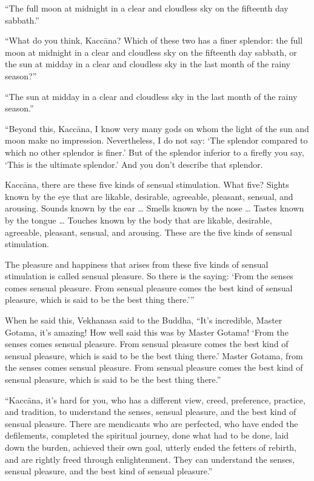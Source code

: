 \documentclass[12pt,openany]{book}%
\begin{document}
“The full moon at midnight in a clear and cloudless sky on the fifteenth day sabbath.” 

“What do you think, \textsanskrit{Kaccāna}? Which of these two has a finer splendor: the full moon at midnight in a clear and cloudless sky on the fifteenth day sabbath, or the sun at midday in a clear and cloudless sky in the last month of the rainy season?” 

“The sun at midday in a clear and cloudless sky in the last month of the rainy season.” 

“Beyond this, \textsanskrit{Kaccāna}, I know very many gods on whom the light of the sun and moon make no impression. Nevertheless, I do not say: ‘The splendor compared to which no other splendor is finer.’ But of the splendor inferior to a firefly you say, ‘This is the ultimate splendor.’ And you don’t describe that splendor. 

\textsanskrit{Kaccāna}, there are these five kinds of sensual stimulation. What five? Sights known by the eye that are likable, desirable, agreeable, pleasant, sensual, and arousing. Sounds known by the ear … Smells known by the nose … Tastes known by the tongue … Touches known by the body that are likable, desirable, agreeable, pleasant, sensual, and arousing. These are the five kinds of sensual stimulation. 

The pleasure and happiness that arises from these five kinds of sensual stimulation is called sensual pleasure. So there is the saying: ‘From the senses comes sensual pleasure. From sensual pleasure comes the best kind of sensual pleasure, which is said to be the best thing there.’” 

When he said this, Vekhanasa said to the Buddha, “It’s incredible, Master Gotama, it’s amazing! How well said this was by Master Gotama! ‘From the senses comes sensual pleasure. From sensual pleasure comes the best kind of sensual pleasure, which is said to be the best thing there.’ Master Gotama, from the senses comes sensual pleasure. From sensual pleasure comes the best kind of sensual pleasure, which is said to be the best thing there.” 

“\textsanskrit{Kaccāna}, it’s hard for you, who has a different view, creed, preference, practice, and tradition, to understand the senses, sensual pleasure, and the best kind of sensual pleasure. There are mendicants who are perfected, who have ended the defilements, completed the spiritual journey, done what had to be done, laid down the burden, achieved their own goal, utterly ended the fetters of rebirth, and are rightly freed through enlightenment. They can understand the senses, sensual pleasure, and the best kind of sensual pleasure.” 
\end{document}
